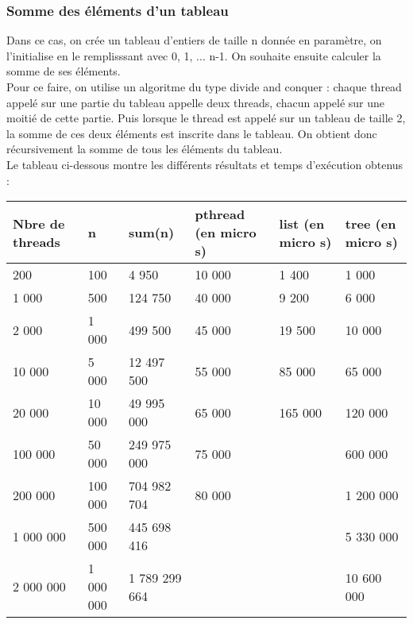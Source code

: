 \subsubsection{Somme des éléments d'un tableau}
Dans ce cas, on crée un tableau d'entiers de taille n donnée en paramètre, on l'initialise en le remplisssant avec 0, 1, ... n-1. On souhaite ensuite calculer la somme de ses éléments.\\
Pour ce faire, on utilise un algoritme du type divide and conquer : chaque thread appelé sur une partie du tableau appelle deux threads, chacun appelé sur une moitié de cette partie. Puis lorsque le thread est appelé sur un tableau de taille 2, la somme de ces deux éléments est inscrite dans le tableau. On obtient donc récursivement la somme de tous les éléments du tableau.\\

Le tableau ci-dessous montre les différents résultats et temps d'exécution obtenus : \\

\begin{tabular}{|l|l|l|l|l|l|}
  \hline
  Nbre de threads & n & sum(n)  & pthread (en micro s) & list (en micro s) & tree (en micro s)\\
  \hline
  200       & 100       & 4 950         &  10 000 & 1 400   & 1 000      \\
  1 000     & 500       & 124 750       &  40 000 & 9 200   & 6 000      \\
  2 000     & 1 000     & 499 500       &  45 000 & 19 500  & 10 000     \\
  10 000    & 5 000     & 12 497 500    &  55 000 & 85 000  & 65 000     \\
  20 000    & 10 000    & 49 995 000    &  65 000 & 165 000 & 120 000    \\
  100 000   & 50 000    & 249 975 000   &  75 000 &         & 600 000    \\
  200 000   & 100 000   & 704 982 704   &  80 000 &         & 1 200 000  \\
  1 000 000 & 500 000   & 445 698 416   &         &         & 5 330 000  \\
  2 000 000 & 1 000 000 & 1 789 299 664 &         &         & 10 600 000 \\
\hline
\end{tabular}


